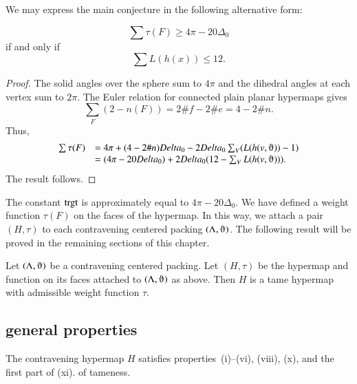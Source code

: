 We may express the main conjecture in the following alternative form:

\begin{lemma}
$$
\sum \tau (F) \ge 4\pi - 20\Delta_0
$$
if and only if
$$
\sum L(h(x)) \le 12.
$$
\end{lemma}

\begin{proof}
The solid angles over the sphere sum to $4\pi$ and the dihedral angles at each vertex sum to $2\pi$.  The Euler relation for connected plain planar hypermaps gives
$$
\sum_F (2- n(F)) = 2\#f - 2\#e = 4 - 2\#n.
$$
Thus,
\begin{equation}\label{eqn:delta0}
\begin{array}{lll}
\sum \tau (F) 
&= 4\pi + (4-2\#n) \Delta_0 - 2\Delta_0 \sum_V (L(h(v,\orgn))-1) \\
&= (4\pi - 20\Delta_0) + 2\Delta_0 (12 - \sum_V L(h(v,\orgn))).
\end{array}
\end{equation}
The result follows.
\end{proof}

The constant ${\operatorname{trgt}}$ is approximately equal to $4\pi - 20\Delta_0$.
We have defined a weight function $\tau(F)$ on the faces of the hypermap.  In this way, we attach a pair $(H,\tau)$ to each contravening centered packing $(\Lambda,\orgn)$.  The following result will be proved in the remaining sections of this chapter.


\begin{theorem} \label{theorem:contravene}
Let $(\Lambda,\orgn)$ be a contravening centered packing.  Let $(H,\tau)$ be
the hypermap and function on its faces attached to $(\Lambda,\orgn)$ as above.
Then $H$ is a tame hypermap with admissible weight function $\tau$.
\end{theorem}




\subsection{general properties}
    \label{sec:startame}



\begin{lemma} The contravening hypermap $H$ satisfies properties~(i)--(vi), (viii),  (x), and the first part of (xi).
of tameness.
\end{lemma}

